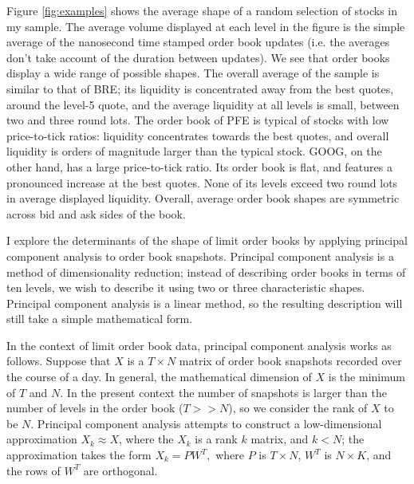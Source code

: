 	Figure \ref{fig:examples} shows the average shape of a random selection of stocks in my sample. The average volume displayed at each level in the figure is the simple average of the nanosecond time stamped order book updates (i.e. the averages don't take account of the duration between updates). We see that order books display a wide range of possible shapes. The overall average of the sample is similar to that of BRE; its liquidity is concentrated away from the best quotes, around the level-5 quote, and the average liquidity at all levels is small, between two and three round lots.  The order book of PFE is typical of stocks with low price-to-tick ratios: liquidity concentrates towards the best quotes, and overall liquidity is orders of magnitude larger than the typical stock. GOOG, on the other hand, has a large price-to-tick ratio. Its order book is flat, and features a pronounced increase at the best quotes. None of its levels exceed two round lots in average displayed liquidity. Overall, average order book shapes are symmetric across bid and ask sides of the book.


	I explore the determinants of the shape of limit order books by applying principal component analysis to order book snapshots. Principal component analysis is a method of dimensionality reduction; instead of describing order books in terms of ten levels, we wish to describe it using two or three characteristic shapes. Principal component analysis is a linear method, so the resulting description will still take a simple mathematical form.

	In the context of limit order book data, principal component analysis works as follows. Suppose that $X$ is a $T \times N$ matrix of order book snapshots recorded over the course of a day. In general, the mathematical dimension of $X$ is the minimum of $T$ and $N$. In the present context the number of snapshots is larger than the number of levels in the order book ($T >> N$), so we consider the rank of $X$ to be $N$. Principal component analysis attempts to construct a low-dimensional approximation $X_k \approx X$, where the $X_k$ is a rank $k$ matrix, and $k < N$; the approximation takes the form $X_k = P W^T,$ where $P$ is $T \times N$, $W^T$ is $N \times K$, and the rows of $W^T$ are orthogonal.

